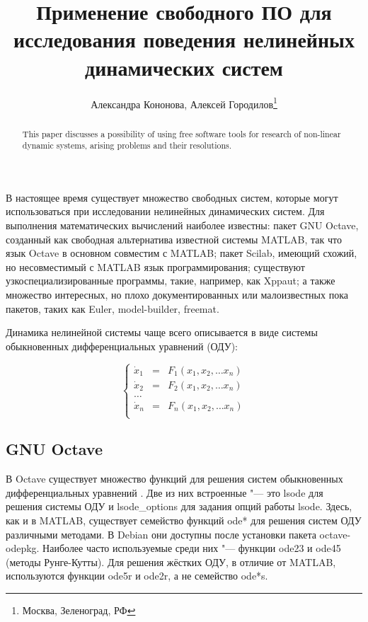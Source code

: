 \documentclass[10pt, a5paper]{article}
\begin{document}
\title{Применение свободного ПО для исследования поведения нелинейных динамических систем}%

\author{Александра Кононова, Алексей Городилов\footnote{Москва, Зеленоград, РФ}}
\maketitle

\begin{abstract}
This paper discusses a possibility of using free software tools for research of non-linear dynamic systems, arising problems and their resolutions.
\end{abstract}

В настоящее время существует множество свободных систем, которые могут использоваться при исследовании нелинейных динамических систем. Для выполнения математических вычислений наиболее известны: пакет GNU Octave, созданный как свободная альтернатива известной системы MATLAB, так что язык Octave в основном совместим с MATLAB; пакет Scilab, имеющий схожий, но несовместимый с MATLAB язык программирования; существуют узкоспециализированные программы, такие, например, как Xppaut; а также множество интересных, но плохо документированных или малоизвестных пока пакетов, таких как Euler, model-builder, freemat.

Динамика нелинейной системы чаще всего описывается в виде системы обыкновенных дифференциальных уравнений (ОДУ):

$$
\left\{ 
\begin{array}{lll}
\dot x_1 &=& F_1(x_1, x_2,   \ldots  x_n )  \\
\dot x_2 &=& F_2(x_1, x_2,   \ldots  x_n )  \\
\ldots \\
\dot x_n &=& F_n(x_1, x_2,  \ldots  x_n )  \\
\end{array}
\right.
$$

\subsection*{GNU Octave}

В Octave существует множество функций для решения систем обыкновенных дифференциальных уравнений \cite{Kon1}. Две из них встроенные "--- это lsode для решения системы ОДУ и lsode\_options для задания опций работы lsode. Здесь, как и в MATLAB, существует семейство функций ode* для решения систем ОДУ различными методами. В Debian они доступны после установки пакета octave-odepkg. Наиболее часто используемые среди них "--- функции ode23 и ode45 (методы Рунге-Кутты). Для решения жёстких ОДУ, в отличие от MATLAB, используются функции ode5r и ode2r, а не семейство ode*s.
\end{document}
